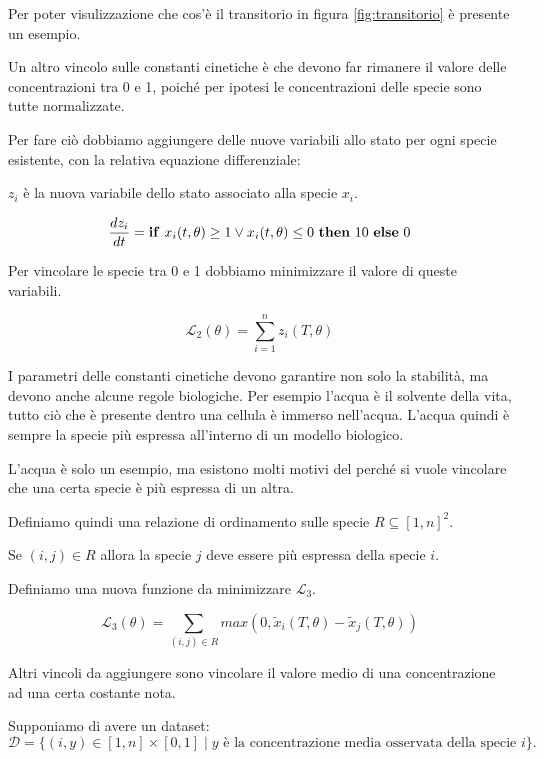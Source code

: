 Per poter visulizzazione che cos'è il transitorio in figura \ref{fig:transitorio} è presente un esempio.

Un altro vincolo sulle constanti cinetiche è che devono far rimanere
il valore delle concentrazioni tra 0 e 1, poiché per ipotesi le concentrazioni delle specie sono tutte normalizzate.

Per fare ciò dobbiamo aggiungere delle nuove variabili allo stato per ogni specie esistente, con la relativa equazione differenziale:

$z_i$ è la nuova variabile dello stato associato alla specie $x_i$.

\begin{equation}
    \frac{d z_i}{d t} = \text{\textbf{if} } x_i(t, \theta) \geq 1 \lor x_i(t,\theta) \leq 0 \text{ \textbf{then} } 10 \text{ \textbf{else} } 0
\end{equation}

Per vincolare le specie tra 0 e 1 dobbiamo minimizzare il valore di queste variabili.

\begin{equation}
    \mathcal{L}_2(\theta) = \sum_{i=1}^n z_i(T, \theta)
\end{equation}

I parametri delle constanti cinetiche devono garantire non solo la stabilità, ma devono anche
alcune regole biologiche. Per esempio l'acqua è il solvente della vita, tutto ciò che
è presente dentro una cellula è immerso nell'acqua. L'acqua quindi è sempre la specie più espressa all'interno di un modello biologico.

L'acqua è solo un esempio, ma esistono molti motivi del perché si vuole vincolare che una certa specie è più espressa di un altra.

Definiamo quindi una relazione di ordinamento sulle specie $R \subseteq [1,n]^2$.

Se $(i,j) \in R$ allora la specie $j$ deve essere più espressa della specie $i$.

Definiamo una nuova funzione da minimizzare $\mathcal{L}_3$.

\begin{equation}
    \mathcal{L}_3(\theta) = \sum_{(i,j) \in R} max(0, \tilde{x}_i(T, \theta) - \tilde{x}_j(T, \theta))
\end{equation}

Altri vincoli da aggiungere sono vincolare il valore medio di una concentrazione ad una certa costante nota.

Supponiamo di avere un dataset:
\[
    \mathcal{D} = \{ (i,y) \in [1,n] \times [0,1] \mid y \text{ è la concentrazione media osservata della specie }i\}.
\]

